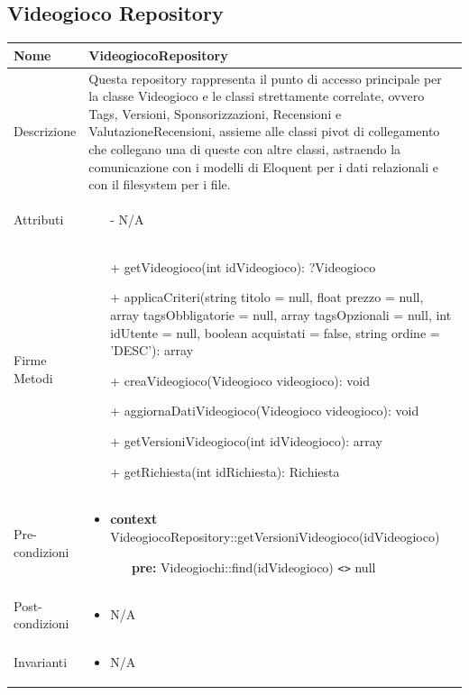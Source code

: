 \subsection{Videogioco Repository}
\small\begin{tabular}{|| l | p{34em} ||} 
	\hline
	Nome & VideogiocoRepository\\
	\hline
	Descrizione & Questa repository rappresenta il punto di accesso principale per la classe Videogioco e le classi strettamente correlate, ovvero Tags, Versioni, Sponsorizzazioni, Recensioni e ValutazioneRecensioni, assieme alle classi pivot di collegamento che collegano una di queste con altre classi, astraendo la comunicazione con i modelli di Eloquent per i dati relazionali e con il filesystem per i file.\\
	\hline
	Attributi & \begin{itemize}
		\item[-] N/A
	\end{itemize}\\
	\hline
	Firme Metodi & \begin{itemize}
		\item[+] getVideogioco(int idVideogioco): ?Videogioco
		\item[+] applicaCriteri(string titolo = null, float prezzo = null, array tagsObbligatorie = null, array tagsOpzionali = null, int idUtente = null, boolean acquistati = false, string ordine = 'DESC'): array
		\item[+] creaVideogioco(Videogioco videogioco): void 
		\item[+] aggiornaDatiVideogioco(Videogioco videogioco): void
		\item[+] getVersioniVideogioco(int idVideogioco): array 
		\item[+] getRichiesta(int idRichiesta): Richiesta  
	\end{itemize}\\
	\hline
Pre-condizioni & \begin{itemize}[leftmargin=*]
	\item \textbf{context} VideogiocoRepository::getVersioniVideogioco(idVideogioco)
	\begin{itemize}
		\item[ ] \textbf{pre:} Videogiochi::find(idVideogioco) \verb|<>| null
	\end{itemize}
\end{itemize}\\
\hline
Post-condizioni & \begin{itemize}[leftmargin=*]
	\item N/A
\end{itemize}\\
\hline
Invarianti & \begin{itemize}
	\item N/A
\end{itemize}\\
\hline
\end{tabular}

